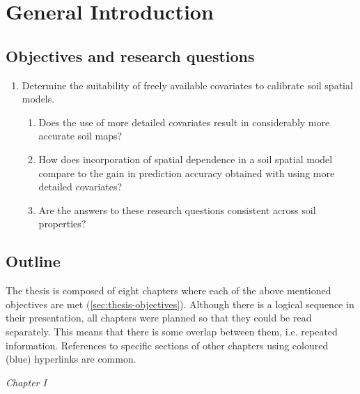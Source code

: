 \setcounter{page}{1}
\artigofalse
\chapter{General Introduction}
\label{chap:introduction}


\section{Objectives and research questions}
\label{sec:thesis-objectives}

\begin{enumerate}
 \item Determine the suitability of freely available covariates to calibrate soil spatial models.

  \begin{enumerate}[label=(\alph*)]
   \item Does the use of more detailed covariates result in considerably more accurate soil maps?
   
   \item How does incorporation of spatial dependence in a soil spatial model compare to the gain in 
   prediction accuracy obtained with using more detailed covariates?
   
   \item Are the answers to these research questions consistent across soil properties?
  \end{enumerate}
\end{enumerate}




\section{Outline}
\label{sec:thesis-outline}

The thesis is composed of eight chapters where each of the above mentioned objectives are met 
(\autoref{sec:thesis-objectives}). Although there is a logical sequence in their presentation, all chapters 
were planned so that they could be read separately. This means that there is some overlap between them, i.e. 
repeated information. References to specific sections of other chapters using coloured (blue) hyperlinks are 
common.

\emph{Chapter I}

